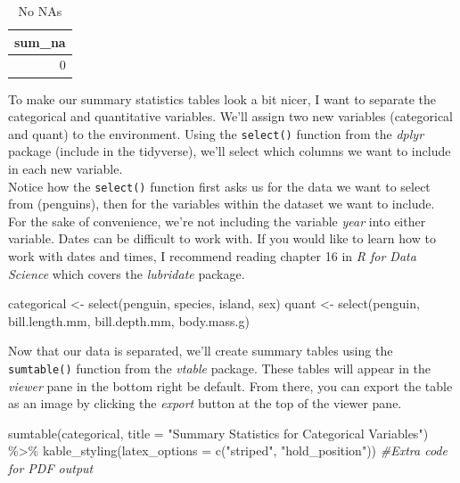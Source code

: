 \documentclass[
]{article}
\newenvironment{Shaded}{\begin{snugshade}}{\end{snugshade}}
\newcommand{\AttributeTok}[1]{\textcolor[rgb]{0.77,0.63,0.00}{#1}}
\newcommand{\CommentTok}[1]{\textcolor[rgb]{0.56,0.35,0.01}{\textit{#1}}}
\newcommand{\FunctionTok}[1]{\textcolor[rgb]{0.00,0.00,0.00}{#1}}
\newcommand{\NormalTok}[1]{#1}
\newcommand{\OtherTok}[1]{\textcolor[rgb]{0.56,0.35,0.01}{#1}}
\newcommand{\SpecialCharTok}[1]{\textcolor[rgb]{0.00,0.00,0.00}{#1}}
\newcommand{\StringTok}[1]{\textcolor[rgb]{0.31,0.60,0.02}{#1}}
\begin{document}
\begin{table}[!h]

\caption{\label{tab:missing data confirm}No NAs}
\centering
\begin{tabular}[t]{r}
\hline
sum\_na\\
\hline
0\\
\hline
\end{tabular}
\end{table}

To make our summary statistics tables look a bit nicer, I want to
separate the categorical and quantitative variables. We'll assign two
new variables (categorical and quant) to the environment. Using the
\texttt{select()} function from the \emph{dplyr} package (include in the
tidyverse), we'll select which columns we want to include in each new
variable.\\
Notice how the \texttt{select()} function first asks us for the data we
want to select from (penguins), then for the variables within the
dataset we want to include.\\
For the sake of convenience, we're not including the variable
\emph{year} into either variable. Dates can be difficult to work with.
If you would like to learn how to work with dates and times, I recommend
reading chapter 16 in \emph{R for Data Science} which covers the
\emph{lubridate} package.

\begin{Shaded}
\begin{Highlighting}[]
\NormalTok{categorical }\OtherTok{\textless{}{-}} \FunctionTok{select}\NormalTok{(penguin, species, island, sex)}
\NormalTok{quant }\OtherTok{\textless{}{-}} \FunctionTok{select}\NormalTok{(penguin, bill.length.mm, bill.depth.mm, body.mass.g)}
\end{Highlighting}
\end{Shaded}

Now that our data is separated, we'll create summary tables using the
\texttt{sumtable()} function from the \emph{vtable} package. These
tables will appear in the \emph{viewer} pane in the bottom right be
default. From there, you can export the table as an image by clicking
the \emph{export} button at the top of the viewer pane.

\begin{Shaded}
\begin{Highlighting}[]
\FunctionTok{sumtable}\NormalTok{(categorical, }\AttributeTok{title =} \StringTok{"Summary Statistics for Categorical Variables"}\NormalTok{) }\SpecialCharTok{\%\textgreater{}\%} 
  \FunctionTok{kable\_styling}\NormalTok{(}\AttributeTok{latex\_options =} \FunctionTok{c}\NormalTok{(}\StringTok{"striped"}\NormalTok{, }\StringTok{"hold\_position"}\NormalTok{)) }\CommentTok{\#Extra code for PDF output}
\end{Highlighting}
\end{Shaded}
\end{document}
